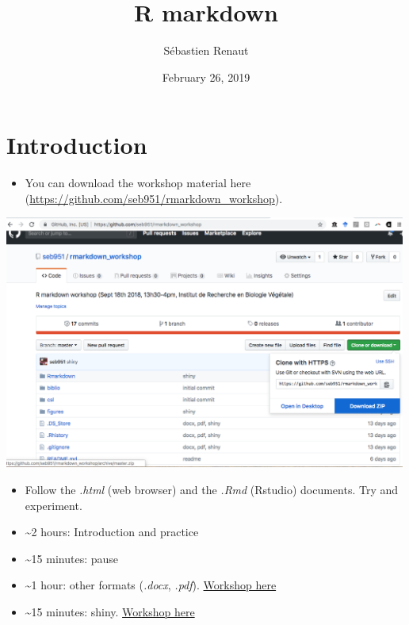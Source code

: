 \documentclass[]{article}
\title{R markdown}
\author{Sébastien Renaut}
\date{February 26, 2019}
\providecommand{\tightlist}{%
  \setlength{\itemsep}{0pt}\setlength{\parskip}{0pt}}
\begin{document}
\maketitle

\hypertarget{introduction}{%
\section{Introduction}\label{introduction}}

\begin{itemize}
\tightlist
\item
  You can download the workshop material here
  (\url{https://github.com/seb951/rmarkdown_workshop}).
\end{itemize}

\includegraphics[width=5.20833in,height=\textheight]{../figures/download.png}\\
\hspace*{0.333em}

\begin{itemize}
\item
  Follow the \emph{.html} (web browser) and the \emph{.Rmd} (Rstudio)
  documents. Try and experiment.
\item
  \textasciitilde{}2 hours: Introduction and practice
\item
  \textasciitilde{}15 minutes: pause
\item
  \textasciitilde{}1 hour: other formats (\emph{.docx}, \emph{.pdf}).
  \href{https://seb951.github.io/rmarkdown_workshop/Rmarkdown/rmarkdown_word_pdf.html}{Workshop
  here}
\item
  \textasciitilde{}15 minutes: shiny.
  \href{https://sebastien.shinyapps.io/shiny/}{Workshop here}
\end{itemize}
\end{document}
